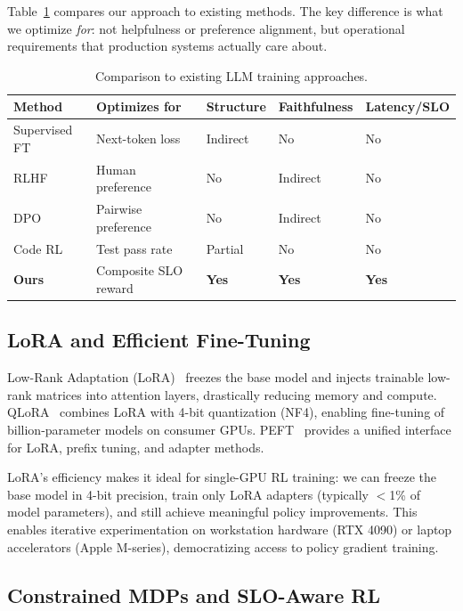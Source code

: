 \documentclass[11pt]{article}
\begin{document}
Table~\ref{tab:method-comparison} compares our approach to existing methods.
The key difference is what we optimize \emph{for}: not helpfulness or preference alignment, but operational requirements that production systems actually care about.

\begin{table}[t]
\centering
\caption{Comparison to existing LLM training approaches.}
\label{tab:method-comparison}
\small
\begin{tabular}{@{}p{2.8cm}p{2.2cm}p{2.2cm}p{2.0cm}p{2.5cm}@{}}
\toprule
\textbf{Method} & \textbf{Optimizes for} & \textbf{Structure} & \textbf{Faithfulness} & \textbf{Latency/SLO} \\
\midrule
Supervised FT & Next-token loss & Indirect & No & No \\
RLHF~\citep{ouyang2022rlhf} & Human preference & No & Indirect & No \\
DPO~\citep{rafailov2023dpo} & Pairwise preference & No & Indirect & No \\
Code RL~\citep{codealign2023} & Test pass rate & Partial & No & No \\
\textbf{Ours} & Composite SLO reward & \textbf{Yes} & \textbf{Yes} & \textbf{Yes} \\
\bottomrule
\end{tabular}
\end{table}

\subsection{LoRA and Efficient Fine-Tuning}

Low-Rank Adaptation (LoRA)~\citep{hu2021lora} freezes the base model and injects trainable low-rank matrices into attention layers, drastically reducing memory and compute.
QLoRA~\citep{dettmers2023qlora} combines LoRA with 4-bit quantization (NF4), enabling fine-tuning of billion-parameter models on consumer GPUs.
PEFT~\citep{mangrulkar2022peft} provides a unified interface for LoRA, prefix tuning, and adapter methods.

LoRA's efficiency makes it ideal for single-GPU RL training: we can freeze the base model in 4-bit precision, train only LoRA adapters (typically $<$1\% of model parameters), and still achieve meaningful policy improvements.
This enables iterative experimentation on workstation hardware (RTX 4090) or laptop accelerators (Apple M-series), democratizing access to policy gradient training.

\subsection{Constrained MDPs and SLO-Aware RL}
\end{document}
